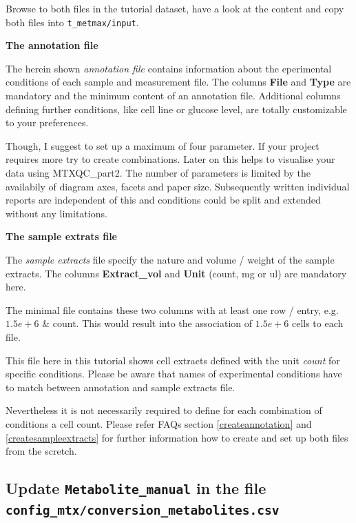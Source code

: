 \documentclass[]{book}
\theoremstyle{definition}
\theoremstyle{definition}
\theoremstyle{definition}
\theoremstyle{remark}
\begin{document}
Browse to both files in the tutorial dataset, have a look at the content
and copy both files into \texttt{t\_metmax/input}.

\textbf{The annotation file}

The herein shown \emph{annotation file} contains information about the
eperimental conditions of each sample and measurement file. The columns
\textbf{File} and \textbf{Type} are mandatory and the minimum content of
an annotation file. Additional columns defining further conditions, like
cell line or glucose level, are totally customizable to your
preferences.

Though, I suggest to set up a maximum of four parameter. If your project
requires more try to create combinations. Later on this helps to
visualise your data using MTXQC\_part2. The number of parameters is
limited by the availabily of diagram axes, facets and paper size.
Subsequently written individual reports are independent of this and
conditions could be split and extended without any limitations.

\textbf{The sample extrats file}

The \emph{sample extracts} file specify the nature and volume / weight
of the sample extracts. The columns \textbf{Extract\_vol} and
\textbf{Unit} (count, mg or ul) are mandatory here.

The minimal file contains these two columns with at least one row /
entry, e.g. \(1.5e+6\) \& count. This would result into the association
of \(1.5e+6\) cells to each file.

This file here in this tutorial shows cell extracts defined with the
unit \emph{count} for specific conditions. Please be aware that names of
experimental conditions have to match between annotation and sample
extracts file.

Nevertheless it is not necessarily required to define for each
combination of conditions a cell count. Please refer FAQs section
\ref{createannotation} and \ref{createsampleextracts} for further
information how to create and set up both files from the scretch.

\subsection{\texorpdfstring{Update \texttt{Metabolite\_manual} in the
file
\texttt{config\_mtx/conversion\_metabolites.csv}}{Update Metabolite\_manual in the file config\_mtx/conversion\_metabolites.csv}}\label{update-metabolite_manual-in-the-file-config_mtxconversion_metabolites.csv}
\end{document}
